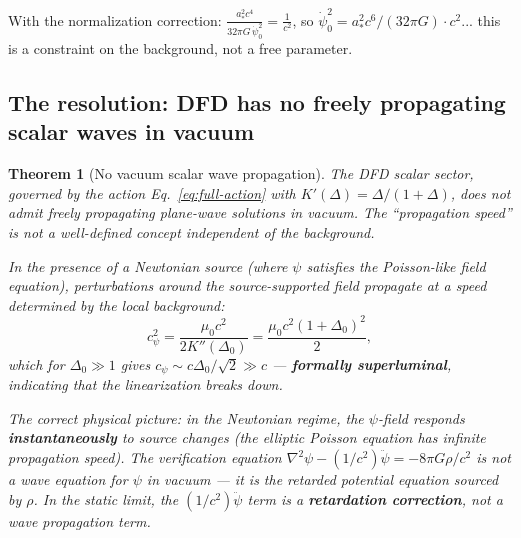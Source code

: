 \documentclass[11pt]{article}
\newtheorem{theorem}{Theorem}
\begin{document}
With the normalization correction:
$\frac{a_*^2 c^4}{32\pi G\,\dot\psi_0^2} = \frac{1}{c^2}$,
so $\dot\psi_0^2 = a_*^2 c^6/(32\pi G) \cdot c^2$... this is a
constraint on the background, not a free parameter.

\subsection{The resolution: DFD has no freely propagating scalar waves
in vacuum}

\begin{theorem}[No vacuum scalar wave propagation]
\label{thm:no-vacuum-wave}
The DFD scalar sector, governed by the action Eq.~\eqref{eq:full-action}
with $K'(\Delta) = \Delta/(1+\Delta)$, does not admit freely propagating
plane-wave solutions in vacuum. The ``propagation speed'' is not a
well-defined concept independent of the background.

In the presence of a Newtonian source (where $\psi$ satisfies the
Poisson-like field equation), perturbations around the source-supported
field propagate at a speed determined by the local background:
\begin{equation}
c_\psi^2 = \frac{\mu_0 c^2}{2K''(\Delta_0)} = \frac{\mu_0 c^2(1+\Delta_0)^2}{2},
\end{equation}
which for $\Delta_0 \gg 1$ gives $c_\psi \sim c\Delta_0/\sqrt{2}
\gg c$ --- \textbf{formally superluminal}, indicating that the
linearization breaks down.

The correct physical picture: in the Newtonian regime, the $\psi$-field
responds \textbf{instantaneously} to source changes (the elliptic
Poisson equation has infinite propagation speed). The verification
equation $\nabla^2\psi - (1/c^2)\ddot\psi = -8\pi G\rho/c^2$ is not
a wave equation for $\psi$ in vacuum --- it is the retarded potential
equation sourced by $\rho$. In the static limit, the $(1/c^2)\ddot\psi$
term is a \textbf{retardation correction}, not a wave propagation term.
\end{theorem}
\end{document}
